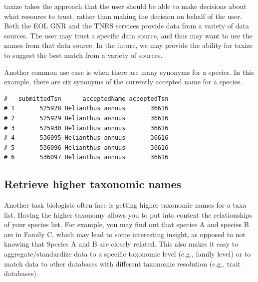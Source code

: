 \begin{sloppypar}
taxize takes the approach that the user should be able to make decisions about what resource to trust, rather than making the decision on behalf of the user. 
Both the EOL GNR and the TNRS services provide data from a variety of data sources. 
The user may trust a specific data source, and thus may want to use the names from that data source. 
In the future, we may provide the ability for taxize to suggest the best match from a variety of sources.

Another common use case is when there are many synonyms for a species. 
In this example, there are six synonyms of the currently accepted name for a species. 

\begin{knitrout}
\small

\color{fgcolor}
\begin{kframe}
\begin{alltt}
 \hlkwb{<-} \hlstd{(}\hlstd{,}
             \hlstd{,}
             \hlstd{,}
             \hlstd{,}
             \hlstd{,}
             \hlstd{)}
 \hlkwb{<-} 
\end{alltt}
\begin{verbatim}
#   submittedTsn      acceptedName acceptedTsn
# 1       525928 Helianthus annuus       36616
# 2       525929 Helianthus annuus       36616
# 3       525930 Helianthus annuus       36616
# 4       536095 Helianthus annuus       36616
# 5       536096 Helianthus annuus       36616
# 6       536097 Helianthus annuus       36616
\end{verbatim}
\end{kframe}
\end{knitrout}


\subsection{Retrieve higher taxonomic names}
Another task biologists often face is getting higher taxonomic names for a taxa list. 
Having the higher taxonomy allows you to put into context the relationships of your species list. 
For example, you may find out that species A and species B are in Family C, which may lead to some interesting insight, as opposed to not knowing that Species A and B are closely related.
 This also makes it easy to aggregate/standardize data to a specific taxonomic level (e.g., family level) or to match data to other databases with different taxonomic resolution (e.g., trait databases).


\end{sloppypar}
